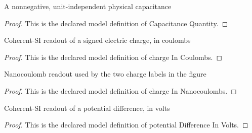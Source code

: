 \begin{definition}
  \label{def:physics:phyx-mini-0873:phyxminiproblems-problemphyxmini0873-capacitancequantity}
  A nonnegative, unit-independent physical capacitance
\end{definition}
\begin{proof}
  This is the declared model definition of Capacitance Quantity.
\end{proof}
\begin{definition}
  \label{def:physics:phyx-mini-0873:phyxminiproblems-problemphyxmini0873-chargeincoulombs}
  Coherent-SI readout of a signed electric charge, in coulombs
\end{definition}
\begin{proof}
  This is the declared model definition of charge In Coulombs.
\end{proof}
\begin{definition}
  \label{def:physics:phyx-mini-0873:phyxminiproblems-problemphyxmini0873-chargeinnanocoulombs}
  Nanocoulomb readout used by the two charge labels in the figure
\end{definition}
\begin{proof}
  This is the declared model definition of charge In Nanocoulombs.
\end{proof}
\begin{definition}
  \label{def:physics:phyx-mini-0873:phyxminiproblems-problemphyxmini0873-potentialdifferenceinvolts}
  Coherent-SI readout of a potential difference, in volts
\end{definition}
\begin{proof}
  This is the declared model definition of potential Difference In Volts.
\end{proof}
